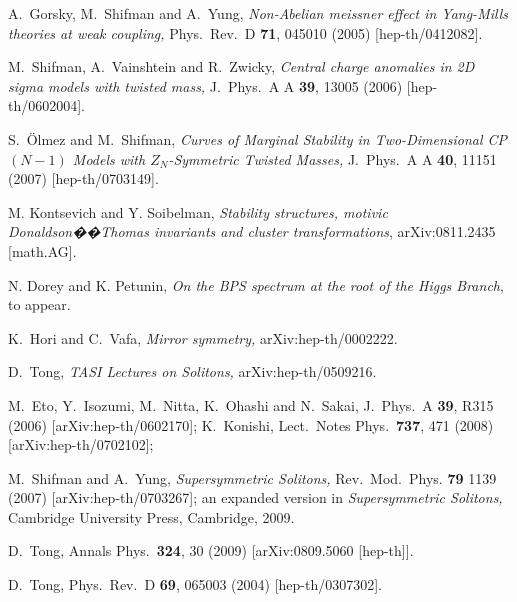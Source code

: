 \documentclass[epsfig,12pt]{article}
\begin{document}
\begin{thebibliography}{99}
  A.~Gorsky, M.~Shifman and A.~Yung,
 {\em Non-Abelian meissner effect in Yang-Mills theories at weak coupling,}
  Phys.\ Rev.\ D {\bf 71}, 045010 (2005)
  [hep-th/0412082].

  M.~Shifman, A.~Vainshtein and R.~Zwicky,
{\em Central charge anomalies in 2D sigma models with twisted mass,}
  J.\ Phys.\ A A {\bf 39}, 13005 (2006)
  [hep-th/0602004].
  
S.~\"Olmez and M.~Shifman,
{\em Curves of Marginal Stability in Two-Dimensional CP$(N-1)$ Models with $Z_N$-Symmetric Twisted Masses,}
  J.\ Phys.\ A A {\bf 40}, 11151 (2007)
  [hep-th/0703149].

M.  Kontsevich and Y. Soibelman, 
{\em Stability structures, motivic Donaldson��Thomas invariants and cluster transformations},
arXiv:0811.2435 [math.AG].

N. Dorey and K. Petunin,
{\em On the BPS spectrum at the root of the Higgs Branch}, to appear.
  
  K.~Hori and C.~Vafa,
{\em Mirror symmetry,}
  arXiv:hep-th/0002222.

D.~Tong,
{\em TASI Lectures on Solitons,}
  arXiv:hep-th/0509216.

  M.~Eto, Y.~Isozumi, M.~Nitta, K.~Ohashi and N.~Sakai,
  J.\ Phys.\ A  {\bf 39}, R315 (2006)
  [arXiv:hep-th/0602170];
K.~Konishi,
  Lect.\ Notes Phys.\  {\bf 737}, 471 (2008)
  [arXiv:hep-th/0702102];

M.~Shifman and A.~Yung,
{\sl Supersymmetric Solitons,}
Rev.\ Mod.\ Phys. {\bf 79} 1139 (2007)
[arXiv:hep-th/0703267]; an expanded version in {\sl Supersymmetric Solitons,}
Cambridge University Press, Cambridge, 2009.

D.~Tong,
  Annals Phys.\  {\bf 324}, 30 (2009)
  [arXiv:0809.5060 [hep-th]].

D.~Tong,
Phys.\ Rev.\ D {\bf 69}, 065003 (2004)
[hep-th/0307302].


\end{thebibliography}
\end{document}
